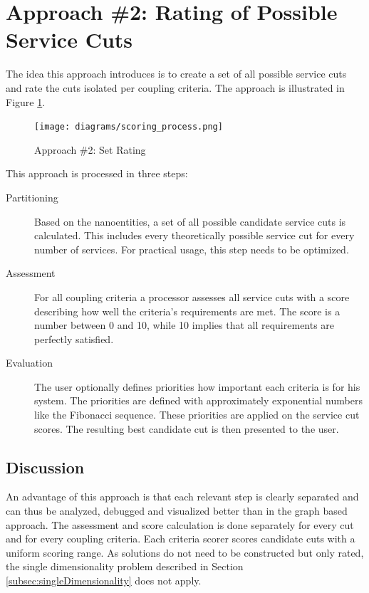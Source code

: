 \section{Approach \#2: Rating of Possible Service Cuts}

The idea this approach introduces is to create a set of all possible service cuts and rate the cuts isolated per coupling criteria. The approach is illustrated in Figure \ref{fig:setProcess}.

\begin{figure}[H]
	\begin{center}
		\texttt{[image: diagrams/scoring\_process.png]}
	\end{center}
	\caption{Approach \#2: Set Rating}
	\label{fig:setProcess}
\end{figure}

This approach is processed in three steps:

\begin{description}
	\item[Partitioning] Based on the nanoentities, a set of all possible candidate service cuts is calculated. This includes every theoretically possible service cut for every number of services. For practical usage, this step needs to be optimized. 
	\item[Assessment] For all coupling criteria a processor assesses all service cuts with a score describing how well the criteria's requirements are met. The score is a number between 0 and 10, while 10 implies that all requirements are perfectly satisfied. 
	\item[Evaluation] The user optionally defines priorities how important each criteria is for his system. The priorities are defined with approximately exponential numbers like the Fibonacci sequence. These priorities are applied on the service cut scores. The resulting best candidate cut is then presented to the user.
\end{description}

\subsection{Discussion}

An advantage of this approach is that each relevant step is clearly separated and can thus be analyzed, debugged and visualized better than in the graph based approach. The assessment and score calculation is done separately for every cut and for every coupling criteria. Each criteria scorer scores candidate cuts with a uniform scoring range. As solutions do not need to be constructed but only rated, the single dimensionality problem described in Section \ref{subsec:singleDimensionality} does not apply.

